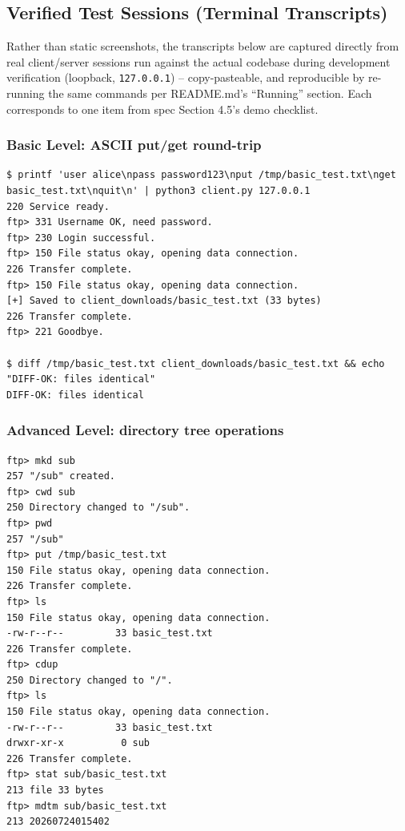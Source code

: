 \documentclass[11pt]{article}
\begin{document}
\clearpage
\subsection{Verified Test Sessions (Terminal Transcripts)}

Rather than static screenshots, the transcripts below are captured directly from
real client/server sessions run against the actual codebase during development
verification (loopback, \texttt{127.0.0.1}) -- copy-pasteable, and reproducible by
re-running the same commands per README.md's ``Running'' section. Each corresponds
to one item from spec Section 4.5's demo checklist.

\subsubsection{Basic Level: ASCII put/get round-trip}
\begin{lstlisting}
$ printf 'user alice\npass password123\nput /tmp/basic_test.txt\nget basic_test.txt\nquit\n' | python3 client.py 127.0.0.1
220 Service ready.
ftp> 331 Username OK, need password.
ftp> 230 Login successful.
ftp> 150 File status okay, opening data connection.
226 Transfer complete.
ftp> 150 File status okay, opening data connection.
[+] Saved to client_downloads/basic_test.txt (33 bytes)
226 Transfer complete.
ftp> 221 Goodbye.

$ diff /tmp/basic_test.txt client_downloads/basic_test.txt && echo "DIFF-OK: files identical"
DIFF-OK: files identical
\end{lstlisting}

\subsubsection{Advanced Level: directory tree operations}
\begin{lstlisting}
ftp> mkd sub
257 "/sub" created.
ftp> cwd sub
250 Directory changed to "/sub".
ftp> pwd
257 "/sub"
ftp> put /tmp/basic_test.txt
150 File status okay, opening data connection.
226 Transfer complete.
ftp> ls
150 File status okay, opening data connection.
-rw-r--r--         33 basic_test.txt
226 Transfer complete.
ftp> cdup
250 Directory changed to "/".
ftp> ls
150 File status okay, opening data connection.
-rw-r--r--         33 basic_test.txt
drwxr-xr-x          0 sub
226 Transfer complete.
ftp> stat sub/basic_test.txt
213 file 33 bytes
ftp> mdtm sub/basic_test.txt
213 20260724015402
\end{lstlisting}
\end{document}
